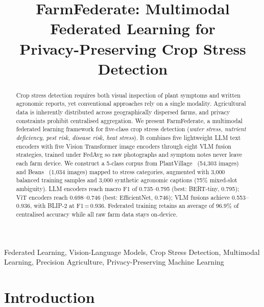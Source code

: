 \documentclass[conference]{IEEEtran}
\begin{document}
\renewcommand{\arraystretch}{0.95}
\setlength{\abovecaptionskip}{4pt}
\setlength{\belowcaptionskip}{2pt}
\renewcommand{\dbltopfraction}{0.9}
\renewcommand{\topfraction}{0.9}

\title{FarmFederate: Multimodal Federated Learning for\\
Privacy-Preserving Crop Stress Detection}

\author{%
}

\maketitle

\begin{abstract}
Crop stress detection requires both visual inspection of plant symptoms and
written agronomic reports, yet conventional approaches rely on a single
modality. Agricultural data is inherently distributed across geographically
dispersed farms, and privacy constraints prohibit centralised aggregation.
We present FarmFederate, a multimodal federated learning framework for
five-class crop stress detection (\textit{water stress, nutrient deficiency,
pest risk, disease risk, heat stress}). It combines five lightweight LLM
text encoders with five Vision Transformer image encoders through eight VLM
fusion strategies, trained under FedAvg so raw photographs and symptom
notes never leave each farm device. We construct a 5-class corpus from
PlantVillage~\cite{Mohanty2016} (54,303 images) and Beans~\cite{Beans2020}
(1,034 images) mapped to stress categories, augmented with 3,000 balanced
training samples and 3,000 synthetic agronomic captions (75\% mixed-slot
ambiguity). LLM encoders reach macro F1 of 0.735--0.795 (best: BERT-tiny,
0.795); ViT encoders reach 0.698--0.746 (best: EfficientNet, 0.746); VLM
fusions achieve 0.553--0.936, with BLIP-2 at F1\,=\,0.936. Federated
training retains an average of 96.9\% of centralised accuracy while all
raw farm data stays on-device.
\end{abstract}

\begin{IEEEkeywords}
Federated Learning, Vision-Language Models, Crop Stress Detection,
Multimodal Learning, Precision Agriculture, Privacy-Preserving Machine Learning
\end{IEEEkeywords}

\section{Introduction}
\end{document}
